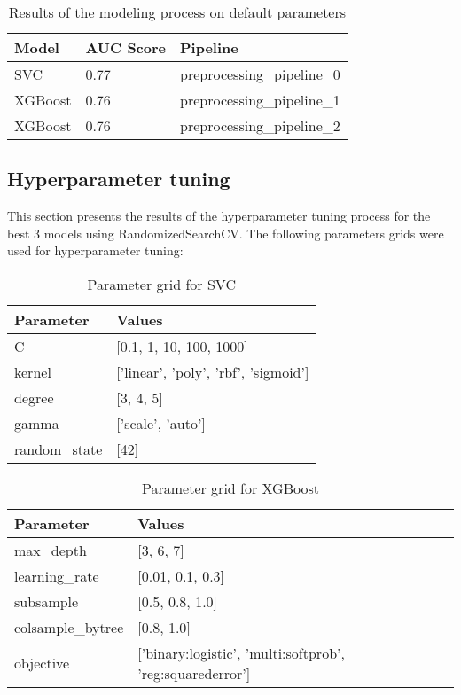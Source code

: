 \documentclass{article}%
\begin{document}
\begin{table}[H]%
\begin{center}%
\begin{tabular}{p{30mm} p{20mm} p{50mm}}%
\hline%
\textbf{Model}&\textbf{AUC Score}&\textbf{Pipeline}\\%
\hline%
SVC&0.77&preprocessing\_pipeline\_0\\%
XGBoost&0.76&preprocessing\_pipeline\_1\\%
XGBoost&0.76&preprocessing\_pipeline\_2\\%
\hline%
\end{tabular}%
\end{center}%
\caption{Results of the modeling process on default parameters}%
\end{table}

%
\subsection{Hyperparameter tuning}%
\label{subsec:Hyperparametertuning}%

%
This section presents the results of the hyperparameter tuning process for the best 3 models using RandomizedSearchCV.%
The following parameters grids were used for hyperparameter tuning:%


\begin{table}[H]%
\begin{center}%
\begin{tabular}{p{30mm} p{70mm}}%
\hline%
\textbf{Parameter}&\textbf{Values}\\%
\hline%
C&{[}0.1, 1, 10, 100, 1000{]}\\%
kernel&{[}'linear', 'poly', 'rbf', 'sigmoid'{]}\\%
degree&{[}3, 4, 5{]}\\%
gamma&{[}'scale', 'auto'{]}\\%
random\_state&{[}42{]}\\%
\hline%
\end{tabular}%
\end{center}%
\caption{Parameter grid for SVC}%
\end{table}

%


\begin{table}[H]%
\begin{center}%
\begin{tabular}{p{30mm} p{70mm}}%
\hline%
\textbf{Parameter}&\textbf{Values}\\%
\hline%
max\_depth&{[}3, 6, 7{]}\\%
learning\_rate&{[}0.01, 0.1, 0.3{]}\\%
subsample&{[}0.5, 0.8, 1.0{]}\\%
colsample\_bytree&{[}0.8, 1.0{]}\\%
objective&{[}'binary:logistic', 'multi:softprob', 'reg:squarederror'{]}\\%
\hline%
\end{tabular}%
\end{center}%
\caption{Parameter grid for XGBoost}%
\end{table}
\end{document}

